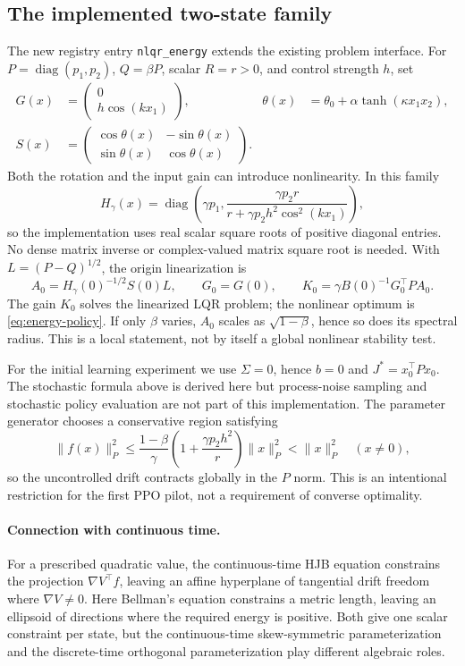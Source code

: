 \documentclass[11pt]{article}
\begin{document}
\subsection{The implemented two-state family}
\label{sec:implemented-generator}

The new registry entry \texttt{nlqr\_energy} extends the existing problem interface.
For $P=\operatorname{diag}(p_1,p_2)$, $Q=\beta P$, scalar $R=r>0$, and
control strength $h$, set
\begin{align}
 G(x)&=\begin{pmatrix}0\\ h\cos(kx_1)\end{pmatrix}, &
 \theta(x)&=\theta_0+\alpha\tanh(\kappa x_1x_2),\\
 S(x)&=\begin{pmatrix}\cos\theta(x)&-\sin\theta(x)\\
                         \sin\theta(x)&\cos\theta(x)\end{pmatrix}.
\end{align}
Both the rotation and the input gain can introduce nonlinearity. In this family
\[
 H_\gamma(x)=\operatorname{diag}\left(\gamma p_1,
 \frac{\gamma p_2 r}{r+\gamma p_2 h^2\cos^2(kx_1)}\right),
\]
so the implementation uses real scalar square roots of positive diagonal entries.
No dense matrix inverse or complex-valued matrix square root is needed.
With $L=(P-Q)^{1/2}$, the origin linearization is
\[
 A_0=H_\gamma(0)^{-1/2}S(0)L,\qquad G_0=G(0),\qquad
 K_0=\gamma B(0)^{-1}G_0^\top PA_0.
\]
The gain $K_0$ solves the linearized LQR problem; the nonlinear optimum is
\eqref{eq:energy-policy}. If only $\beta$ varies, $A_0$ scales as
$\sqrt{1-\beta}$, hence so does its spectral radius. This is a local statement,
not by itself a global nonlinear stability test.

For the initial learning experiment we use $\Sigma=0$, hence $b=0$ and
$J^*=x_0^\top Px_0$. The stochastic formula above is derived here but process-noise
sampling and stochastic policy evaluation are not part of this implementation.
The parameter generator chooses a conservative region satisfying
\[
 \|f(x)\|_P^2\leq
 \frac{1-\beta}{\gamma}\left(1+\frac{\gamma p_2h^2}{r}\right)\|x\|_P^2
 <\|x\|_P^2\quad (x\ne0),
\]
so the uncontrolled drift contracts globally in the $P$ norm. This is an intentional
restriction for the first PPO pilot, not a requirement of converse optimality.

\paragraph{Connection with continuous time.}
For a prescribed quadratic value, the continuous-time HJB equation constrains the
projection $\nabla V^\top f$, leaving an affine hyperplane of tangential drift freedom
where $\nabla V\ne0$. Here Bellman's equation constrains a metric length, leaving an
ellipsoid of directions where the required energy is positive. Both give one scalar
constraint per state, but the continuous-time skew-symmetric parameterization and the
discrete-time orthogonal parameterization play different algebraic roles.
\end{document}
